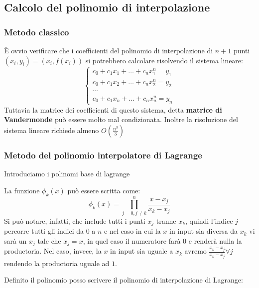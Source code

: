 \subsection{Calcolo del polinomio di interpolazione}

\subsubsection{Metodo classico}
È ovvio verificare che i coefficienti del polinomio di interpolazione di $n+1$ punti $(x_i, y_i)=(x_i, f(x_i))$ si potrebbero calcolare risolvendo il sistema lineare:
\[
    \begin{cases}
        c_0 + c_1x_1 + \dots + c_n x^n_1 = y_1 \\
        c_0 + c_1x_2 + \dots + c_n x^n_2 = y_2 \\
        \cdots \\
        c_0 + c_1x_n + \dots + c_n x^n_n = y_n
    \end{cases}
\]
Tuttavia la matrice dei coefficienti di questo sistema, detta \textbf{matrice di Vandermonde} può essere molto mal condizionata. Inoltre la risoluzione del sistema lineare richiede almeno $O(\frac{n^3}{3})$

\subsubsection{Metodo del polinomio interpolatore di Lagrange}

Introduciamo i polinomi base di lagrange

La funzione $\phi_k(x)$ può essere scritta come:
\[
    \phi_k(x) = \prod_{j=0, j\neq k} ^ n \frac{x - x_j}{x_k - x_j}
\]
Si può notare, infatti, che include tutti i punti $x_j$ tranne $x_k$, quindi l'indice $j$ percorre tutti gli indici da $0$ a $n$ e nel caso in cui la $x$ in input sia diversa da $x_k$ vi sarà un $x_j$ tale che $x_j = x$, in quel caso il numeratore farà $0$ e renderà nulla la productoria. Nel caso, invece, la $x$ in input sia uguale a $x_k$ avremo $\frac{x_k - x_j}{x_k - x_j} \forall j$ rendendo la productoria uguale ad $1$.

Definito il polinomio posso scrivere il polinomio di interpolazione di Lagrange:


